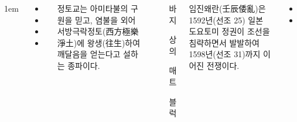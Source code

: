 \documentclass[25pt, a1paper ]{tikzposter}
\begin{document}
\begin{columns}
			{
					\setlength{\leftmargini}{3em}
					\setlength{\labelsep} {1em}
				\begin{LARGE}
					\begin{itemize}
					\item 
					\item 
					\item 
					\item 
					\end{itemize}
				\end{LARGE}
			}



		{
			정토교는 아미타불의 구원을 믿고, 
				염불을 외어 서방극락정토(西方極樂淨土)에 왕생(往生)하여 깨달음을 얻는다고 설하는 종파이다.
		}		




			{				
			\setlength{\leftmargini}{5em}			
			\setlength{\labelsep}{1em} %
			\begin{LARGE}
			\begin{itemize}
			\item [바지]
			\item [상의]
			\item [매트]
			\item [블럭]
			\end{itemize}
			\end{LARGE}
		}




			{				
			임진왜란(壬辰倭亂)은 1592년(선조 25) 일본 도요토미 정권이 조선을 침략하면서 발발하여 1598년(선조 31)까지 이어진 전쟁이다.
			}


			{				

			}

			{				
			\setlength{\leftmargini}{3em}			
			\setlength{\labelsep}{1em} %
			\begin{LARGE}
			\begin{itemize}
			\item 
			\item 
			\end{itemize}
			\end{LARGE}
		}


	\end{columns}
\end{document}
